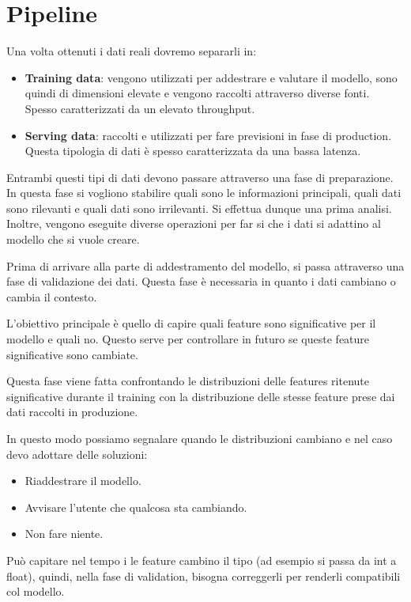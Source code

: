\section{Pipeline}
Una volta ottenuti i dati reali dovremo separarli in:
\begin{itemize}
    \item \textbf{Training data}: vengono utilizzati per addestrare e valutare
          il modello, sono quindi di dimensioni elevate e vengono raccolti
          attraverso diverse fonti. Spesso caratterizzati da un elevato throughput.
    \item \textbf{Serving data}: raccolti e utilizzati per fare previsioni in
          fase di production. Questa tipologia di dati è spesso caratterizzata
          da una bassa latenza.
\end{itemize}
Entrambi questi tipi di dati devono passare attraverso una fase di preparazione.
In questa fase si vogliono stabilire quali sono le informazioni principali,
quali dati sono rilevanti e quali dati sono irrilevanti. Si effettua dunque una
prima analisi. Inoltre, vengono eseguite diverse operazioni per far si che i dati
si adattino al modello che si vuole creare.

Prima di arrivare alla parte di addestramento del modello, si passa attraverso una
fase di validazione dei dati. Questa fase è necessaria in quanto i dati cambiano
o cambia il contesto.

L'obiettivo principale è quello di capire quali feature sono significative
per il modello e quali no. Questo serve per controllare in futuro se queste
feature significative sono cambiate.

Questa fase viene fatta confrontando le distribuzioni delle features ritenute
significative durante il training con la distribuzione delle stesse feature prese
dai dati raccolti in produzione.

In questo modo possiamo segnalare quando le distribuzioni cambiano e nel caso devo
adottare delle soluzioni:
\begin{itemize}
    \item Riaddestrare il modello.
    \item Avvisare l'utente che qualcosa sta cambiando.
    \item Non fare niente.
\end{itemize}
Può capitare nel tempo i le feature cambino il tipo (ad esempio si passa da int
a float), quindi, nella fase di validation, bisogna correggerli per renderli
compatibili col modello.

